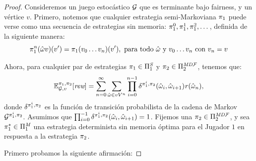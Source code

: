 \begin{proof}
  Consideremos un juego estocástico $\mathcal{G}$ que es terminante bajo fairness, y un vértice $v$. Primero, notemos que cualquier estrategia semi-Markoviana $\pi_{1}$ puede verse como una secuencia de estrategias sin memoria: $\pi_{1}^{0},\pi_{1}^{1},\pi_{1}^{2}, \dots$,  definida de la siguiente manera:
  \begin{equation}\label{eq:def-memoryless-strat-for-semimarkov}
    \pi_{1}^{n}(\hat{\omega}v)(v') = \pi_{1}(v_0 \dots v_n)(v'), \text{ para todo $\hat{\omega}$ y $v_0 \dots v_n$ con $v_n = v$}
  \end{equation}

  Ahora,  para cualquier par de estrategias $\pi_{1} \in \Pi^{\textit{S}}_{1}$ y $\pi_{2} \in \Pi^{\textit{MD}\mathcal{F}}_{2}$, tenemos que:
  \[
  \mathbb{E}^{\pi_{1}, \pi_{2}}_{\mathcal{G},v}[\textit{rew}] = 
  \sum^\infty_{n=0} \sum_{\hat{\omega} \in vV^n} \prod^{n-1}_{i=0} \delta^{\pi_{1}^i,\pi_{2}}(\hat{\omega}_i, \hat{\omega}_{i+1}) \mathit{r}(\hat{\omega}_n),
  \]
  donde $\delta^{\pi_{1}^i,\pi_{2}}$ es la función de transición probabilista de la cadena de Markov $\mathcal{G}^{\pi_{1}^i,\pi_{2}}$.  Asumimos que $\prod^{-1}_{i=0} \delta^{\pi_{1}^i,\pi_{2}}(\hat{\omega}_i, \hat{\omega}_{i+1}) = 1$.
%
  Fijemos una $\pi_{2} \in \Pi^{\textit{MD}\mathcal{F}}_{2}$, y sea $\pi^*_{1} \in \Pi^{\textit{M}}_{1}$ una estrategia determinista sin memoria óptima para el Jugador $1$  en respuesta a la estrategia $\pi_{2}$.

  Primero probamos la siguiente afirmación:


\end{proof}
